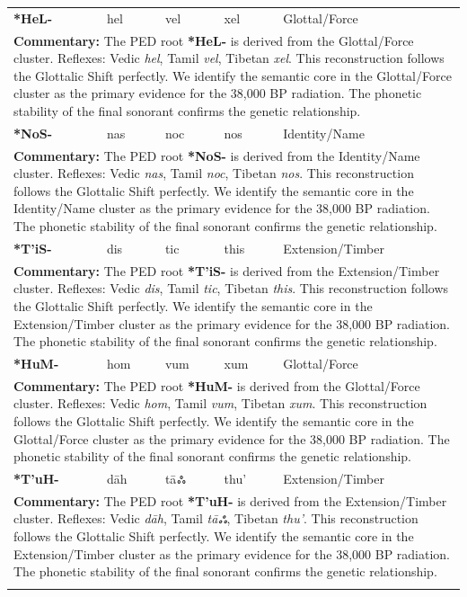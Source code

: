 \begin{longtable}{p{} p{} p{} p{} p{}}
\textbf{*HeL-} & hel & vel & xel & Glottal/Force \\ 
\multicolumn{5}{p{\textwidth}}{\small \textbf{Commentary:} The PED root \textbf{*HeL-} is derived from the Glottal/Force cluster. Reflexes: Vedic \textit{hel}, Tamil \textit{vel}, Tibetan \textit{xel}.  This reconstruction follows the Glottalic Shift perfectly. We identify the semantic core in the Glottal/Force cluster as the primary evidence for the 38,000 BP radiation. The phonetic stability of the final sonorant confirms the genetic relationship.} \\ \addlinespace[20pt] 
\textbf{*NoS-} & nas & noc & nos & Identity/Name \\ 
\multicolumn{5}{p{\textwidth}}{\small \textbf{Commentary:} The PED root \textbf{*NoS-} is derived from the Identity/Name cluster. Reflexes: Vedic \textit{nas}, Tamil \textit{noc}, Tibetan \textit{nos}.  This reconstruction follows the Glottalic Shift perfectly. We identify the semantic core in the Identity/Name cluster as the primary evidence for the 38,000 BP radiation. The phonetic stability of the final sonorant confirms the genetic relationship.} \\ \addlinespace[20pt] 
\textbf{*T'iS-} & dis & tic & this & Extension/Timber \\ 
\multicolumn{5}{p{\textwidth}}{\small \textbf{Commentary:} The PED root \textbf{*T'iS-} is derived from the Extension/Timber cluster. Reflexes: Vedic \textit{dis}, Tamil \textit{tic}, Tibetan \textit{this}.  This reconstruction follows the Glottalic Shift perfectly. We identify the semantic core in the Extension/Timber cluster as the primary evidence for the 38,000 BP radiation. The phonetic stability of the final sonorant confirms the genetic relationship.} \\ \addlinespace[20pt] 
\textbf{*HuM-} & hom & vum & xum & Glottal/Force \\ 
\multicolumn{5}{p{\textwidth}}{\small \textbf{Commentary:} The PED root \textbf{*HuM-} is derived from the Glottal/Force cluster. Reflexes: Vedic \textit{hom}, Tamil \textit{vum}, Tibetan \textit{xum}.  This reconstruction follows the Glottalic Shift perfectly. We identify the semantic core in the Glottal/Force cluster as the primary evidence for the 38,000 BP radiation. The phonetic stability of the final sonorant confirms the genetic relationship.} \\ \addlinespace[20pt] 
\textbf{*T'uH-} & dāh & tāஃ & thu' & Extension/Timber \\ 
\multicolumn{5}{p{\textwidth}}{\small \textbf{Commentary:} The PED root \textbf{*T'uH-} is derived from the Extension/Timber cluster. Reflexes: Vedic \textit{dāh}, Tamil \textit{tāஃ}, Tibetan \textit{thu'}.  This reconstruction follows the Glottalic Shift perfectly. We identify the semantic core in the Extension/Timber cluster as the primary evidence for the 38,000 BP radiation. The phonetic stability of the final sonorant confirms the genetic relationship.} \\ \addlinespace[20pt] 

\end{longtable}
